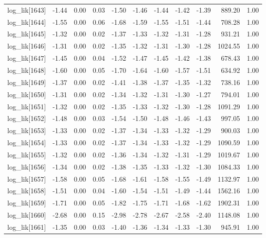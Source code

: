 \begin{table}[ht]
\begin{tabular}{rrrrrrrrrrr}
  log\_lik[1643] & -1.44 & 0.00 & 0.03 & -1.50 & -1.46 & -1.44 & -1.42 & -1.39 & 889.20 & 1.00 \\ 
  log\_lik[1644] & -1.55 & 0.00 & 0.06 & -1.68 & -1.59 & -1.55 & -1.51 & -1.44 & 708.28 & 1.00 \\ 
  log\_lik[1645] & -1.32 & 0.00 & 0.02 & -1.37 & -1.33 & -1.32 & -1.31 & -1.28 & 931.21 & 1.00 \\ 
  log\_lik[1646] & -1.31 & 0.00 & 0.02 & -1.35 & -1.32 & -1.31 & -1.30 & -1.28 & 1024.55 & 1.00 \\ 
  log\_lik[1647] & -1.45 & 0.00 & 0.04 & -1.52 & -1.47 & -1.45 & -1.42 & -1.38 & 678.43 & 1.00 \\ 
  log\_lik[1648] & -1.60 & 0.00 & 0.05 & -1.70 & -1.64 & -1.60 & -1.57 & -1.51 & 634.92 & 1.00 \\ 
  log\_lik[1649] & -1.37 & 0.00 & 0.02 & -1.41 & -1.38 & -1.37 & -1.35 & -1.32 & 738.16 & 1.00 \\ 
  log\_lik[1650] & -1.31 & 0.00 & 0.02 & -1.34 & -1.32 & -1.31 & -1.30 & -1.27 & 794.01 & 1.00 \\ 
  log\_lik[1651] & -1.32 & 0.00 & 0.02 & -1.35 & -1.33 & -1.32 & -1.30 & -1.28 & 1091.29 & 1.00 \\ 
  log\_lik[1652] & -1.48 & 0.00 & 0.03 & -1.54 & -1.50 & -1.48 & -1.46 & -1.43 & 997.05 & 1.00 \\ 
  log\_lik[1653] & -1.33 & 0.00 & 0.02 & -1.37 & -1.34 & -1.33 & -1.32 & -1.29 & 900.03 & 1.00 \\ 
  log\_lik[1654] & -1.33 & 0.00 & 0.02 & -1.37 & -1.34 & -1.33 & -1.32 & -1.29 & 1090.59 & 1.00 \\ 
  log\_lik[1655] & -1.32 & 0.00 & 0.02 & -1.36 & -1.34 & -1.32 & -1.31 & -1.29 & 1019.67 & 1.00 \\ 
  log\_lik[1656] & -1.34 & 0.00 & 0.02 & -1.38 & -1.35 & -1.33 & -1.32 & -1.30 & 1084.33 & 1.00 \\ 
  log\_lik[1657] & -1.58 & 0.00 & 0.05 & -1.68 & -1.61 & -1.58 & -1.55 & -1.49 & 1132.97 & 1.00 \\ 
  log\_lik[1658] & -1.51 & 0.00 & 0.04 & -1.60 & -1.54 & -1.51 & -1.49 & -1.44 & 1562.16 & 1.00 \\ 
  log\_lik[1659] & -1.71 & 0.00 & 0.05 & -1.82 & -1.75 & -1.71 & -1.68 & -1.62 & 1902.31 & 1.00 \\ 
  log\_lik[1660] & -2.68 & 0.00 & 0.15 & -2.98 & -2.78 & -2.67 & -2.58 & -2.40 & 1148.08 & 1.00 \\ 
  log\_lik[1661] & -1.35 & 0.00 & 0.03 & -1.40 & -1.36 & -1.34 & -1.33 & -1.30 & 945.91 & 1.00 \\ 

\end{tabular}
\end{table}
